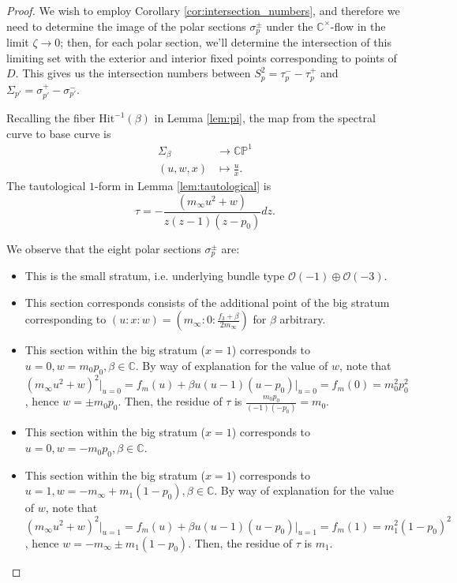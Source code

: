 \documentclass[12pt,letterpaper,reqno]{amsart}
\def\mathbf#1{#1}%
\theoremstyle{remark}
\theoremstyle{definition}
\numberwithin{thm}{section}
\numberwithin{equation}{section}
\numberwithin{figure}{section}
\newcommand{\cO}{\ensuremath{\mathcal O}}
\newcommand{\C}{\ensuremath{\mathbb C}}
\begin{document}
 \begin{proof}
 We wish to employ Corollary \ref{cor:intersection_numbers}, and therefore we need to determine the image of the polar sections $\sigma_p^\pm$ under the $\C^\times$-flow in the limit $\zeta \to 0$; then, for each polar section, we'll determine the intersection of this limiting set with the exterior and interior fixed points corresponding to points of $D$. This gives us the intersection numbers between $S^2_p = \tau_p^- - \tau_p^+$ and $\Sigma_{p'} = \sigma^+_{p'} - \sigma^-_{p'}$.

Recalling the fiber $\mathrm{Hit}^{-1}(\beta)$ in Lemma \ref{lem:pi},
the map from the spectral curve to base curve is 
\begin{align}
\Sigma_\beta &\rightarrow \mathbb{CP}^1 \\ \nonumber 
(u, w, x) &\mapsto \frac{u}{x}.
\end{align}
The tautological $1$-form in Lemma \ref{lem:tautological} is 
\[ \tau = -\frac{(m_\infty u^2 + w)}{z(z-1)(z-p_0)} dz.\]

We observe that the eight polar sections $\sigma^\pm_p$ are:
\begin{itemize}
\item[$\sigma^+_\infty$ \quad ] This is the small stratum, i.e. underlying bundle type $\cO(-1) \oplus \cO(-3)$. 

\item[$\sigma^-_\infty$ \quad ]  This section corresponds consists of the additional point of the big stratum corresponding to $(u: x: w)=(m_\infty: 0: \frac{f_3 + \beta}{2 m_\infty})$ for $\beta$ arbitrary.

\item [$\sigma^+_0$ \quad ] This section within the big stratum  ($x=1$) corresponds to $u=0, w=m_0p_0, \beta \in \C$. By way of explanation for the value of $w$, note that $(m_\infty u^2 + w)^2\Big|_{u=0}=f_{\mathbf{m}}(u) + \beta u(u-1)(u-p_0) \Big|_{u=0} = f_{\mathbf{m}}(0) = m_0^2 p_0^2$, hence $w=\pm m_0p_0$. Then, the residue of $\tau$ is $\frac{m_0p_0}{(-1)(-p_0)} = m_0$. 

\item [$\sigma^-_0$ \quad ] This section within the big stratum  ($x=1$) corresponds to $u=0, w=-m_0p_0, \beta \in \C$. 

\item[$\sigma^+_1$ \quad ]  This section within the big stratum  ($x=1$) corresponds to $u=1, w=-m_\infty + m_1(1-p_0), \beta \in \C$. By way of explanation for the value of $w$, note that $(m_\infty u^2 + w)^2\Big|_{u=1}=f_{\mathbf{m}}(u) + \beta u(u-1)(u-p_0) \Big|_{u=1} = f_{\mathbf{m}}(1) = m_1^2(1-p_0)^2$, hence $w=-m_\infty \pm m_1(1-p_0)$. Then, the residue of $\tau$ is $m_1$.


\end{itemize}
\end{proof}
\end{document}
